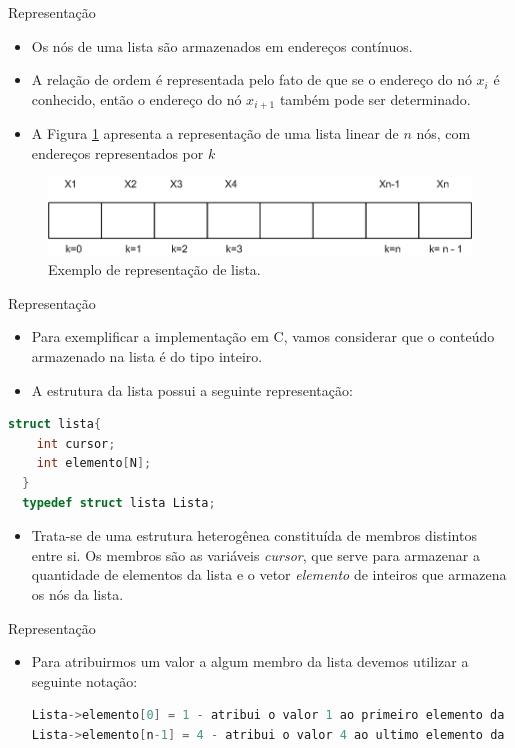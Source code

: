 \begin{frame}{Representação}
\begin{itemize}
	\item Os nós de uma lista são armazenados em endereços contínuos.
	\item A relação de ordem é representada pelo fato de que se o endereço do nó $x_i$ é conhecido, então o endereço do nó $x_{i+1}$ também pode ser determinado. 	
	\item A Figura \ref{fig:lista-linear-repre} apresenta a representação de uma lista linear de $n$ nós, com endereços representados por $k$
\end{itemize}
\begin{figure}[ht]
	\centering
		\includegraphics[width=.6\textwidth]{figs/fig_listas/lista-linear.png}				\caption{Exemplo de representação de lista.}	
				\label{fig:lista-linear-repre}
			\end{figure} 
\end{frame}

\begin{frame}[fragile,c]{Representação}
\begin{itemize}
	\item Para exemplificar a implementação em C, vamos considerar que o conteúdo armazenado na lista é do tipo inteiro.
	\item A estrutura da lista possui a seguinte representação:	
\end{itemize}
\begin{lstlisting}[language=C]
  struct lista{
    int cursor;
    int elemento[N];
  }
  typedef struct lista Lista;
\end{lstlisting}
\begin{itemize}
	\item Trata-se de uma estrutura heterogênea constituída de membros distintos entre si. Os membros são as variáveis \alert{\textit{cursor}}, que serve para armazenar a quantidade de elementos da lista e o vetor \alert{\textit{elemento}} de inteiros que armazena os nós da lista.
\end{itemize}
\end{frame}

\begin{frame}[fragile,c]{Representação}
\begin{itemize}
	\item Para atribuirmos um valor a algum membro da lista devemos utilizar a seguinte notação:

\small	
\begin{lstlisting}[language=C]
Lista->elemento[0] = 1 - atribui o valor 1 ao primeiro elemento da lista.
Lista->elemento[n-1] = 4 - atribui o valor 4 ao ultimo elemento da lista.
\end{lstlisting}
\end{itemize}
\end{frame}  

